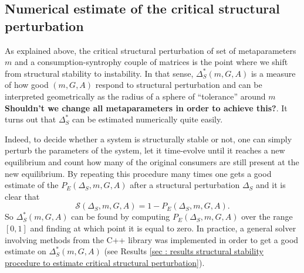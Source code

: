 \documentclass[12pt, titlepage]{report}
\begin{document}
\subsection{Numerical estimate of the critical structural perturbation}\label{sec : structural stability methods numerical estimate critical perturbation}
As explained above, the critical structural perturbation of set of metaparameters $m$ and a consumption-syntrophy couple of matrices is the point where we shift from structural stability to instability. In that sense, $\Delta_S^*(m, G, A)$ is a measure of how good $(m, G, A)$ respond to structural perturbation and can be interpreted geometrically as the radius of a sphere of ``tolerance'' around $m$ \textbf{Shouldn't we change all metaparameters in order to achieve this?}. It turns out that $\Delta_S^*$ can be estimated numerically quite easily.

Indeed, to decide whether a system is structurally stable or not, one can simply perturb the parameters of the system, let it time-evolve until it reaches a new equilibrium and count how many of the original consumers are still present at the new equilibrium. By repeating this procedure many times one gets a good estimate of the  $P_E(\Delta_S, m, G, A)$
after a structural perturbation $\Delta_S$ and it is clear that
\begin{equation}
\mathcal{S}(\Delta_S, m, G, A)=1-P_E(\Delta_S, m, G, A).
\end{equation}
So $\Delta_S^*(m, G, A)$ can be found by computing $P_E(\Delta_S, m, G, A)$ over the range $[0,1]$ and finding at which point it is equal to zero. In practice, a general solver involving methods from the C++  library was implemented in order to get a good estimate on $\Delta_S^*(m, G, A)$ (see Results \ref{sec : results structural stability procedure to estimate critical structural perturbation}).

\end{document}
